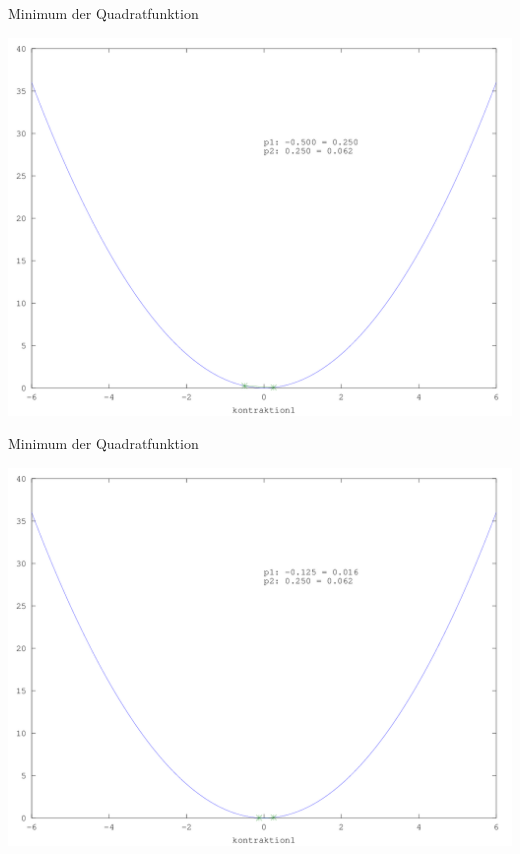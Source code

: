 \documentclass[\outputformat]{beamer}
\begin{document}
\begin{frame}{Minimum der Quadratfunktion}
	\begin{center}
		\includegraphics[height=0.75\paperheight]{../bilder/Quadrat/sinx_x005.png}
	\end{center}
\end{frame}
\begin{frame}{Minimum der Quadratfunktion}
	\begin{center}
		\includegraphics[height=0.75\paperheight]{../bilder/Quadrat/sinx_x006.png}
	\end{center}
\end{frame}
\end{document}
